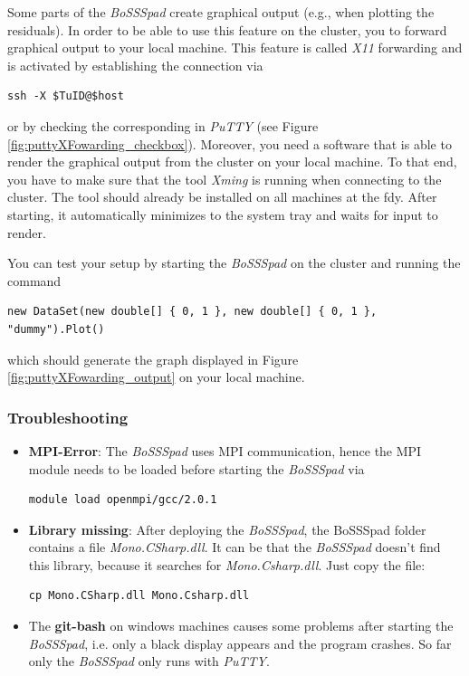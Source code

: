 \documentclass[11pt,twoside,a4paper]{fdyartcl}
\newcommand{\clearemptydoublepage}%
{\newpage{\pagestyle{empty}\cleardoublepage}}
\begin{document}
Some parts of the \emph{BoSSSpad} create graphical output (e.g., when plotting the residuals). In order to be able to use this feature on the cluster, you to forward graphical output to your local machine. This feature is called \emph{X11} forwarding and is activated by establishing the connection via
\begin{verbatim}
ssh -X $TuID@$host
\end{verbatim}
or by checking the corresponding in \emph{PuTTY} (see Figure \ref{fig:puttyXFowarding_checkbox}). Moreover, you need a software that is able to render the graphical output from the cluster on your local machine. To that end, you have to make sure that the tool \emph{Xming} is running when connecting to the cluster. The tool should already be installed on all machines at the fdy. After starting, it automatically minimizes to the system tray and waits for input to render.

You can test your setup by starting the \emph{BoSSSpad} on the cluster and running the command
\begin{verbatim}
new DataSet(new double[] { 0, 1 }, new double[] { 0, 1 }, "dummy").Plot()
\end{verbatim}
which should generate the graph displayed in Figure \ref{fig:puttyXFowarding_output} on your local machine.
\subsubsection{Troubleshooting}
\begin{itemize}
\item \textbf{MPI-Error}:  The \emph{BoSSSpad} uses MPI communication, hence the MPI module needs to be loaded before starting the \emph{BoSSSpad} via
\begin{verbatim}
module load openmpi/gcc/2.0.1
\end{verbatim}
\item \textbf{Library missing}: After deploying the \emph{BoSSSpad}, the BoSSSpad folder contains a file \emph{Mono.CSharp.dll}. It can be that the \emph{BoSSSpad} doesn't find this library, because it searches for \emph{Mono.Csharp.dll}. Just copy the file:
\begin{verbatim}
cp Mono.CSharp.dll Mono.Csharp.dll
\end{verbatim}
\item The \textbf{git-bash} on windows machines causes some problems after starting the \emph{BoSSSpad}, i.e. only a black display appears and the program crashes. So far only the \emph{BoSSSpad} only runs with \emph{PuTTY}.
\end{itemize}


%


\clearemptydoublepage
\end{document}
